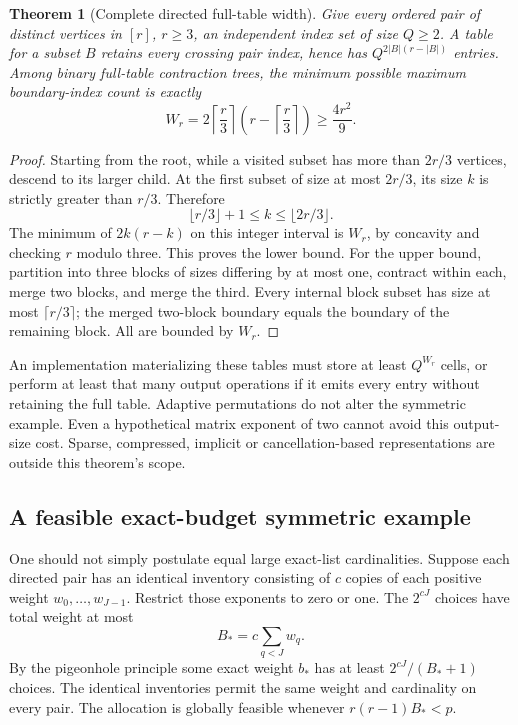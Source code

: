\documentclass[11pt]{article}
\newtheorem{theorem}{Theorem}[section]
\theoremstyle{remark}\newtheorem{remark}[theorem]{Remark}
\begin{document}
\begin{theorem}[Complete directed full-table width]\label{thm:width}
Give every ordered pair of distinct vertices in $[r]$, $r\ge3$, an
independent index set of size $Q\ge2$. A table for a subset $B$ retains
every crossing pair index, hence has $Q^{2|B|(r-|B|)}$ entries. Among binary
full-table contraction trees, the minimum possible maximum boundary-index
count is exactly
\begin{equation}
 W_r=2\left\lceil\frac r3\right\rceil
                \left(r-\left\lceil\frac r3\right\rceil\right)
       \ge\frac{4r^2}{9}.
 \label{eq:width}
\end{equation}
\end{theorem}
\begin{proof}
Starting from the root, while a visited subset has more than $2r/3$
vertices, descend to its larger child. At the first subset of size at most
$2r/3$, its size $k$ is strictly greater than $r/3$. Therefore
\[
 \lfloor r/3\rfloor+1\le k\le\lfloor2r/3\rfloor.
\]
The minimum of $2k(r-k)$ on this integer interval is $W_r$, by concavity
and checking $r$ modulo three. This proves the lower bound. For the upper
bound, partition into three blocks of sizes differing by at most one,
contract within each, merge two blocks, and merge the third. Every internal
block subset has size at most $\lceil r/3\rceil$; the merged two-block
boundary equals the boundary of the remaining block. All are bounded by
$W_r$.
\end{proof}
An implementation materializing these tables must store at least
$Q^{W_r}$ cells, or perform at least that many output operations if it emits
every entry without retaining the full table. Adaptive permutations do not
alter the symmetric example. Even a hypothetical matrix exponent of two
cannot avoid this output-size cost. Sparse, compressed, implicit or
cancellation-based representations are outside this theorem's scope.

\subsection{A feasible exact-budget symmetric example}
One should not simply postulate equal large exact-list cardinalities. Suppose
each directed pair has an identical inventory consisting of $c$ copies of
each positive weight $w_0,\ldots,w_{J-1}$. Restrict those exponents to zero
or one. The $2^{cJ}$ choices have total weight at most
\[
 B_*=c\sum_{q<J}w_q.
\]
By the pigeonhole principle some exact weight $b_*$ has at least
$2^{cJ}/(B_*+1)$ choices. The identical inventories permit the same weight
and cardinality on every pair. The allocation is globally feasible whenever
$r(r-1)B_*<p$.
\end{document}
